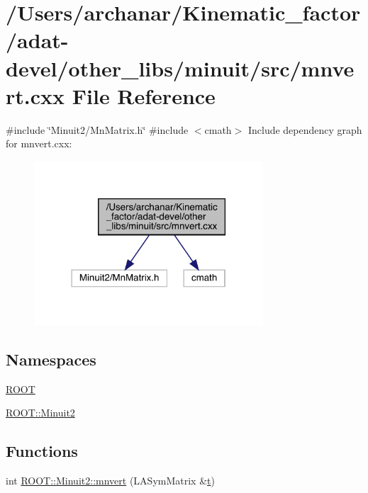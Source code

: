 \hypertarget{adat-devel_2other__libs_2minuit_2src_2mnvert_8cxx}{}\section{/\+Users/archanar/\+Kinematic\+\_\+factor/adat-\/devel/other\+\_\+libs/minuit/src/mnvert.cxx File Reference}
\label{adat-devel_2other__libs_2minuit_2src_2mnvert_8cxx}
{\ttfamily \#include \char`\"{}Minuit2/\+Mn\+Matrix.\+h\char`\"{}}\newline
{\ttfamily \#include $<$cmath$>$}\newline
Include dependency graph for mnvert.\+cxx\+:
\nopagebreak
\begin{figure}[H]
\begin{center}
\leavevmode
\includegraphics[width=242pt]{d7/d9b/adat-devel_2other__libs_2minuit_2src_2mnvert_8cxx__incl}
\end{center}
\end{figure}
\subsection*{Namespaces}
\begin{DoxyCompactItemize}
\item 
 \mbox{\hyperlink{namespaceROOT}{R\+O\+OT}}
\item 
 \mbox{\hyperlink{namespaceROOT_1_1Minuit2}{R\+O\+O\+T\+::\+Minuit2}}
\end{DoxyCompactItemize}
\subsection*{Functions}
\begin{DoxyCompactItemize}
\item 
int \mbox{\hyperlink{namespaceROOT_1_1Minuit2_a5e64c8eae56aaee62f3b683068e1148a}{R\+O\+O\+T\+::\+Minuit2\+::mnvert}} (L\+A\+Sym\+Matrix \&\mbox{\hyperlink{adat__devel_2lib_2hadron_2hadron__timeslice_8cc_ac310d9181e916ba43604099aee272c71}{t}})
\end{DoxyCompactItemize}
